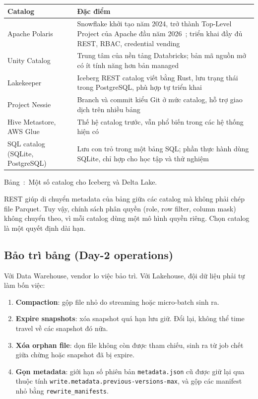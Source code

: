 \documentclass[12pt]{article}
\newenvironment{figblock}{\par\medskip\noindent\begin{minipage}{\linewidth}}{\end{minipage}\par\medskip}
\newcounter{bang}
\newcommand{\tabcap}[2]{%
  \begin{captionbelowboxaivn}\refstepcounter{bang}Bảng~\thebang:~#1\label{#2}\end{captionbelowboxaivn}}
\begin{document}
\begin{figblock}\begin{center}
\renewcommand{\arraystretch}{1.3}
\begin{tabularx}{\linewidth}{|P{3.2cm}|L|}
\hline
{}
\textbf{Catalog} & \textbf{Đặc điểm} \\
\hline
Apache Polaris & Snowflake khởi tạo năm 2024, trở thành Top-Level Project của Apache đầu năm 2026~\cite{asf2026polaris}; triển khai đầy đủ REST, RBAC, credential vending \\
\hline
Unity Catalog & Trung tâm của nền tảng Databricks; bản mã nguồn mở có ít tính năng hơn bản managed~\cite{unitycatalog2026} \\
\hline
Lakekeeper & Iceberg REST catalog viết bằng Rust, lưu trạng thái trong PostgreSQL, phù hợp tự triển khai~\cite{lakekeeper2026} \\
\hline
Project Nessie & Branch và commit kiểu Git ở mức catalog, hỗ trợ giao dịch trên nhiều bảng~\cite{nessie2026} \\
\hline
Hive Metastore, AWS Glue & Thế hệ catalog trước, vẫn phổ biến trong các hệ thống hiện có \\
\hline
SQL catalog (SQLite, PostgreSQL) & Lưu con trỏ trong một bảng SQL; phần thực hành dùng SQLite, chỉ hợp cho học tập và thử nghiệm \\
\hline
\end{tabularx}
\end{center}
\tabcap{Một số catalog cho Iceberg và Delta Lake.}{tab:catalogs}
\end{figblock}

\begin{notebox}
REST giúp di chuyển metadata của bảng giữa các catalog mà không phải chép file Parquet. Tuy vậy, chính sách phân quyền (role, row filter, column mask) không chuyển theo, vì mỗi catalog dùng một mô hình quyền riêng. Chọn catalog là một quyết định dài hạn.
\end{notebox}

\subsection{Bảo trì bảng (Day-2 operations)}

Với Data Warehouse, vendor lo việc bảo trì. Với Lakehouse, đội dữ liệu phải tự làm bốn việc:

\begin{enumerate}
    \item \textbf{Compaction}: gộp file nhỏ do streaming hoặc micro-batch sinh ra.
    \item \textbf{Expire snapshots}: xóa snapshot quá hạn lưu giữ. Đổi lại, không thể time travel về các snapshot đó nữa.
    \item \textbf{Xóa orphan file}: dọn file không còn được tham chiếu, sinh ra từ job chết giữa chừng hoặc snapshot đã bị expire.
    \item \textbf{Gọn metadata}: giới hạn số phiên bản \texttt{metadata.json} cũ được giữ lại qua thuộc tính \nolinkurl{write.metadata.previous-versions-max}, và gộp các manifest nhỏ bằng \texttt{rewrite\_manifests}.
\end{enumerate}
\end{document}
